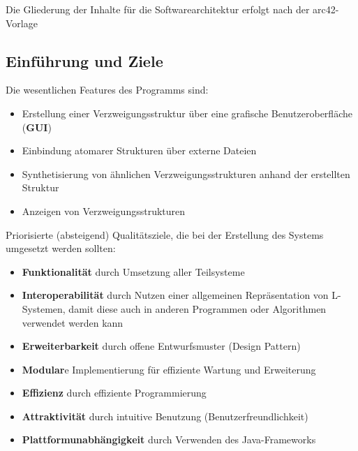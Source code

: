 Die Gliederung der Inhalte für die Softwarearchitektur erfolgt nach der arc42-Vorlage~\cite{arc42}

\subsection{Einführung und Ziele}
Die wesentlichen Features des Programms sind:
\begin{itemize}
    \item Erstellung einer Verzweigungsstruktur über eine grafische Benutzeroberfläche (\textbf{GUI})
    \item Einbindung atomarer Strukturen über externe Dateien
    \item Synthetisierung von ähnlichen Verzweigungsstrukturen anhand der erstellten Struktur
    \item Anzeigen von Verzweigungsstrukturen
\end{itemize}
Priorisierte (absteigend) Qualitätsziele, die bei der Erstellung des Systems umgesetzt werden sollten:
\begin{itemize}
    \item \textbf{Funktionalität} durch Umsetzung aller Teilsysteme
    \item \textbf{Interoperabilität} durch Nutzen einer allgemeinen Repräsentation von L-Systemen, damit diese
    auch in anderen Programmen oder Algorithmen verwendet werden kann
    \item \textbf{Erweiterbarkeit} durch offene Entwurfsmuster (Design Pattern)
    \item \textbf{Modular}e Implementierung für effiziente Wartung und Erweiterung
    \item \textbf{Effizienz} durch effiziente Programmierung
    \item \textbf{Attraktivität} durch intuitive Benutzung (Benutzerfreundlichkeit)
    \item \textbf{Plattformunabhängigkeit} durch Verwenden des Java-Frameworks
\end{itemize}


